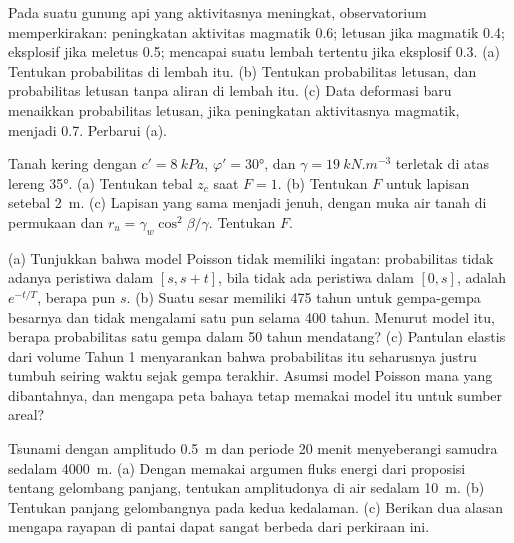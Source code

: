 \begin{exercise}[$\star\star$]\label{exo:b2:geological-hazards:8}
Pada suatu gunung api yang aktivitasnya meningkat, observatorium memperkirakan: peningkatan aktivitas magmatik 0.6; letusan jika magmatik 0.4;
eksplosif jika meletus 0.5;  mencapai suatu lembah tertentu jika eksplosif 0.3. (a) Tentukan
probabilitas  di lembah itu. (b) Tentukan probabilitas letusan, dan
probabilitas letusan tanpa aliran di lembah itu. (c) Data deformasi baru menaikkan probabilitas
letusan, jika peningkatan aktivitasnya magmatik, menjadi 0.7. Perbarui (a).
\end{exercise}

\begin{exercise}[$\star\star$]\label{exo:b2:geological-hazards:9}
Tanah kering dengan $c' = \qty{8}{kPa}$, $\varphi' = \ang{30}$, dan $\gamma = \qty{19}{kN.m^{-3}}$ terletak di atas
lereng \ang{35}. (a) Tentukan tebal $z_c$ saat $F = 1$. (b) Tentukan $F$ untuk lapisan
setebal \qty{2}{m}. (c) Lapisan yang sama menjadi jenuh, dengan muka air tanah di permukaan dan
$r_u = \gamma_w\cos^2\beta/\gamma$. Tentukan $F$.
\end{exercise}

\begin{exercise}[$\star\star\star$]\label{exo:b2:geological-hazards:10}
(a) Tunjukkan bahwa model Poisson tidak memiliki ingatan: probabilitas tidak adanya peristiwa dalam $[s, s + t]$, bila
tidak ada peristiwa dalam $[0, s]$, adalah $e^{-t/T}$, berapa pun $s$. (b) Suatu sesar memiliki  475 tahun untuk
gempa-gempa besarnya dan tidak mengalami satu pun selama 400 tahun. Menurut model itu, berapa probabilitas satu gempa
dalam 50 tahun mendatang? (c) Pantulan elastis dari volume Tahun 1 menyarankan bahwa probabilitas itu
seharusnya justru tumbuh seiring waktu sejak gempa terakhir. Asumsi model Poisson mana
yang dibantahnya, dan mengapa peta bahaya tetap memakai model itu untuk sumber areal?
\end{exercise}

\begin{exercise}[$\star\star\star$]\label{exo:b2:geological-hazards:11}
Tsunami dengan amplitudo \qty{0.5}{m} dan periode 20 menit menyeberangi samudra sedalam \qty{4000}{m}. (a)
Dengan memakai argumen fluks energi dari proposisi tentang gelombang panjang, tentukan amplitudonya di air sedalam \qty{10}{m}.
(b) Tentukan panjang gelombangnya pada kedua kedalaman. (c) Berikan dua alasan mengapa rayapan di pantai
dapat sangat berbeda dari perkiraan ini.
\end{exercise}


